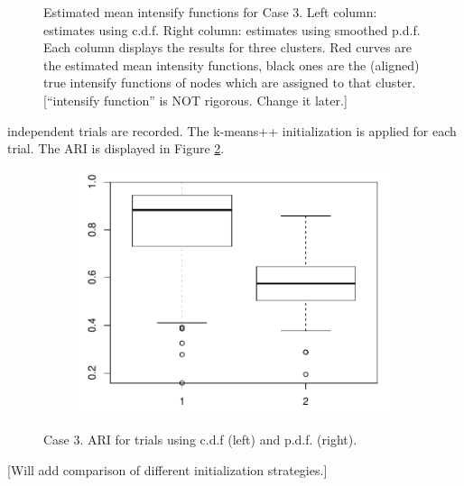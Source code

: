 \begin{figure}[H]
\begin{minipage}{.49\textwidth}
\begin{subfigure}{\linewidth}
\end{subfigure}
\end{minipage}

\caption{Estimated mean intensify functions for Case 3. Left column: estimates using c.d.f. Right column: estimates using smoothed p.d.f.
Each column displays the results for three clusters.
Red curves are the estimated mean intensity functions, black ones are the (aligned) true intensify functions of nodes which are assigned to that cluster.
[``intensify function'' is NOT rigorous. Change it later.]
}
\label{fig: clustering result, case3}
\end{figure}


 independent trials are recorded. 
The k-means++ initialization is applied for each trial.
The ARI is displayed in Figure \ref{fig: ARI, case3}.

\begin{figure}[H]
\begin{subfigure}{.5\textwidth}
\includegraphics[width=\linewidth]{../simulation/plots/boxplot_cdf_vs_pdf_case3.pdf}
\end{subfigure}
\caption{Case 3. ARI for trials using c.d.f (left) and p.d.f. (right).
}
\label{fig: ARI, case3}
\end{figure}

[Will add comparison of different initialization strategies.]



